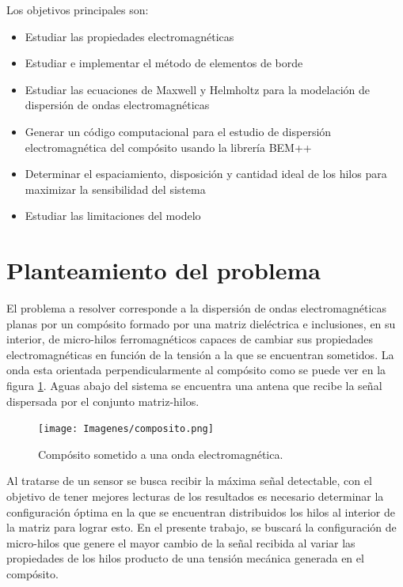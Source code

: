 \documentclass[12pt,letterpaper]{article}
\numberwithin{equation}{section}
\begin{document}
Los objetivos principales son:

\begin{itemize}
	\item Estudiar las propiedades electromagnéticas
	\item Estudiar e implementar el método de elementos de borde
	\item Estudiar las ecuaciones de Maxwell y Helmholtz para la modelación de dispersión de ondas electromagnéticas
	\item Generar un código computacional para el estudio de dispersión electromagnética del compósito usando la librería BEM++
	\item Determinar el espaciamiento, disposición y cantidad ideal de los hilos para maximizar la sensibilidad del sistema
	\item Estudiar las limitaciones del modelo
\end{itemize}

\pagebreak
\section{Planteamiento del problema}
El problema a resolver corresponde a la dispersión de ondas electromagnéticas planas por un compósito formado por una matriz dieléctrica e inclusiones, en su interior, de micro-hilos ferromagnéticos capaces de cambiar sus propiedades electromagnéticas en función de la tensión a la que se encuentran sometidos. La onda esta orientada perpendicularmente al compósito como se puede ver en la figura \ref{fig: composito}. Aguas abajo del sistema se encuentra una antena que recibe la señal dispersada por el conjunto matriz-hilos.

\begin{figure}[H]
	\centering\texttt{[image: Imagenes/composito.png]}
	\caption{Compósito sometido a una onda electromagnética.}
	\label{fig: composito}
\end{figure} 

Al tratarse de un sensor se busca recibir la máxima señal detectable, con el objetivo de tener mejores lecturas de los resultados es necesario determinar la configuración óptima en la que se encuentran distribuidos los hilos al interior de la matriz para lograr esto. En el presente trabajo, se buscará la configuración de micro-hilos que genere el mayor cambio de la señal recibida al variar las propiedades de los hilos producto de una tensión mecánica generada en el compósito.   
\end{document}
